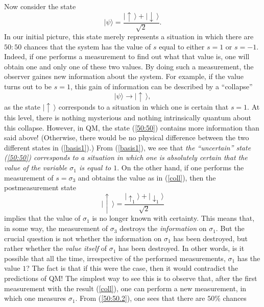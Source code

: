 \documentclass[12pt]{article}
\begin{document}
Now consider the state
\begin{equation}\label{50:50}
|\psi\rangle = \frac{
|\!\uparrow\,\rangle + |\!\downarrow\,\rangle }{\sqrt{2}} .
\end{equation}
In our initial picture, this state merely represents a situation 
in which there are $50:50$ chances that the system has the value of 
$s$ equal to either $s=1$ or $s=-1$. Indeed, 
if one performs a measurement to find out what that value 
is, one will obtain one and only one of these two values. 
By doing such a measurement, the observer gaines new information about 
the system. For example, if the value turns out to be $s=1$, this 
gain of information can be described by a ``collapse''
\begin{equation}\label{coll}
|\psi\rangle \rightarrow |\!\uparrow\,\rangle ,
\end{equation}
as the state $|\!\uparrow\,\rangle$ corresponds to a situation in which 
one is certain that $s=1$.
At this level, there is nothing mysterious and nothing intrinsically
quantum about this collapse. However, in QM, the state (\ref{50:50})
contains more information than said above! 
(Otherwise, there would be no 
physical difference between the two different states in   
(\ref{basis1}).) From (\ref{basis1}), we see that {\em the ``uncertain'' state
(\ref{50:50}) corresponds to a situation in which one is absolutely certain 
that the value of the variable $\sigma_1$ is equal to $1$}. On the other
hand, if one performs the measurement of $s=\sigma_3$ and obtains 
the value as in (\ref{coll}), then 
the postmeasurement state
\begin{equation}\label{50:50.2}
|\!\uparrow\,\rangle = \displaystyle\frac{
|\!\uparrow_1\rangle + |\!\downarrow_1\rangle }{\sqrt{2}}
\end{equation}
implies that the value of $\sigma_1$ is no longer known with certainty.
This means that, in some way, the measurement of $\sigma_3$ destroys 
the {\em information} on $\sigma_1$. But the crucial question is
not whether the information on $\sigma_1$ has been destroyed, 
but rather whether the {\em value itself} of $\sigma_1$ has been destroyed. 
In other words, is it possible that all the time, 
irrespective of the performed measurements, $\sigma_1$ has the value $1$?
The fact is that if this were the case, then it would contradict 
the predictions of QM! The simplest way to see this is to observe 
that, after the first measurement with the result (\ref{coll}), 
one can perform a new measurement, in which one measures $\sigma_1$.
From (\ref{50:50.2}), one sees that there are $50\%$ chances 
\end{document}
